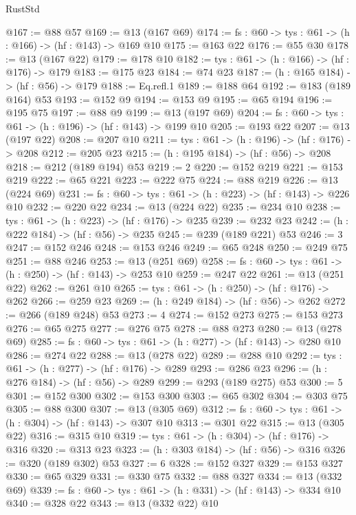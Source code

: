 \begin{lexlean}{RustStd}
\begin{coremodule}
@167 := @88 @57
@169 := @13 (@167 @69)
@174 := {fs : @60} -> {tys : @61} -> (h : @166) -> (hf : @143) -> @169 @10
@175 := @163 @22
@176 := @55 @30
@178 := @13 (@167 @22)
@179 := @178 @10
@182 := {tys : @61} -> (h : @166) -> (hf : @176) -> @179
@183 := @175 @23
@184 := @74 @23
@187 := (h : @165 @184) -> (hf : @56) -> @179
@188 := Eq.refl.{1}
@189 := @188 @64
@192 := @183 (@189 @164) @53
@193 := @152 @9
@194 := @153 @9
@195 := @65 @194
@196 := @195 @75
@197 := @88 @9
@199 := @13 (@197 @69)
@204 := {fs : @60} -> {tys : @61} -> (h : @196) -> (hf : @143) -> @199 @10
@205 := @193 @22
@207 := @13 (@197 @22)
@208 := @207 @10
@211 := {tys : @61} -> (h : @196) -> (hf : @176) -> @208
@212 := @205 @23
@215 := (h : @195 @184) -> (hf : @56) -> @208
@218 := @212 (@189 @194) @53
@219 := 2
@220 := @152 @219
@221 := @153 @219
@222 := @65 @221
@223 := @222 @75
@224 := @88 @219
@226 := @13 (@224 @69)
@231 := {fs : @60} -> {tys : @61} -> (h : @223) -> (hf : @143) -> @226 @10
@232 := @220 @22
@234 := @13 (@224 @22)
@235 := @234 @10
@238 := {tys : @61} -> (h : @223) -> (hf : @176) -> @235
@239 := @232 @23
@242 := (h : @222 @184) -> (hf : @56) -> @235
@245 := @239 (@189 @221) @53
@246 := 3
@247 := @152 @246
@248 := @153 @246
@249 := @65 @248
@250 := @249 @75
@251 := @88 @246
@253 := @13 (@251 @69)
@258 := {fs : @60} -> {tys : @61} -> (h : @250) -> (hf : @143) -> @253 @10
@259 := @247 @22
@261 := @13 (@251 @22)
@262 := @261 @10
@265 := {tys : @61} -> (h : @250) -> (hf : @176) -> @262
@266 := @259 @23
@269 := (h : @249 @184) -> (hf : @56) -> @262
@272 := @266 (@189 @248) @53
@273 := 4
@274 := @152 @273
@275 := @153 @273
@276 := @65 @275
@277 := @276 @75
@278 := @88 @273
@280 := @13 (@278 @69)
@285 := {fs : @60} -> {tys : @61} -> (h : @277) -> (hf : @143) -> @280 @10
@286 := @274 @22
@288 := @13 (@278 @22)
@289 := @288 @10
@292 := {tys : @61} -> (h : @277) -> (hf : @176) -> @289
@293 := @286 @23
@296 := (h : @276 @184) -> (hf : @56) -> @289
@299 := @293 (@189 @275) @53
@300 := 5
@301 := @152 @300
@302 := @153 @300
@303 := @65 @302
@304 := @303 @75
@305 := @88 @300
@307 := @13 (@305 @69)
@312 := {fs : @60} -> {tys : @61} -> (h : @304) -> (hf : @143) -> @307 @10
@313 := @301 @22
@315 := @13 (@305 @22)
@316 := @315 @10
@319 := {tys : @61} -> (h : @304) -> (hf : @176) -> @316
@320 := @313 @23
@323 := (h : @303 @184) -> (hf : @56) -> @316
@326 := @320 (@189 @302) @53
@327 := 6
@328 := @152 @327
@329 := @153 @327
@330 := @65 @329
@331 := @330 @75
@332 := @88 @327
@334 := @13 (@332 @69)
@339 := {fs : @60} -> {tys : @61} -> (h : @331) -> (hf : @143) -> @334 @10
@340 := @328 @22
@343 := @13 (@332 @22) @10

\end{coremodule}
\end{lexlean}
